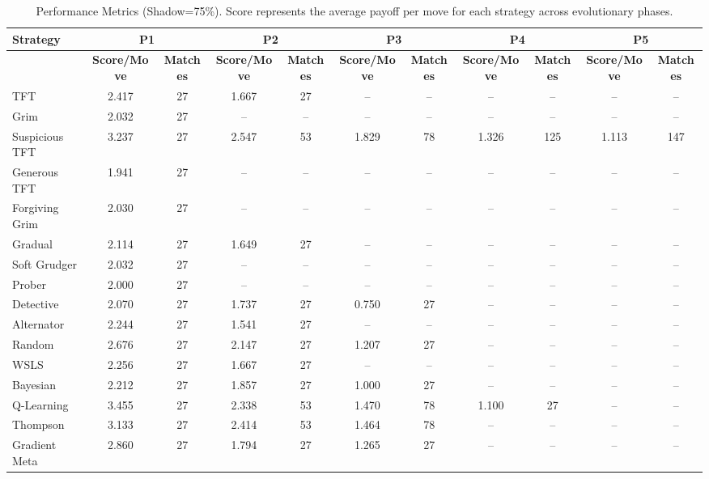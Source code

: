 \begin{table}
\centering
\scriptsize
\caption{Performance Metrics (Shadow=75\%). Score represents the average payoff per move for each strategy across evolutionary phases.}
\label{tab:experiment_20250811_131553_performance}
\begin{tabular}{|l|cc|cc|cc|cc|cc|}
\hline
\textbf{Strategy} & \multicolumn{2}{c|}{\textbf{P1}} & \multicolumn{2}{c|}{\textbf{P2}} & \multicolumn{2}{c|}{\textbf{P3}} & \multicolumn{2}{c|}{\textbf{P4}} & \multicolumn{2}{c|}{\textbf{P5}} \\
\hline
 & \textbf{Score/Move} & \textbf{Matches} & \textbf{Score/Move} & \textbf{Matches} & \textbf{Score/Move} & \textbf{Matches} & \textbf{Score/Move} & \textbf{Matches} & \textbf{Score/Move} & \textbf{Matches} \\
\hline
TFT & 2.417 & 27 & 1.667 & 27 & -- & -- & -- & -- & -- & -- \\
Grim & 2.032 & 27 & -- & -- & -- & -- & -- & -- & -- & -- \\
Suspicious TFT & 3.237 & 27 & 2.547 & 53 & 1.829 & 78 & 1.326 & 125 & 1.113 & 147 \\
Generous TFT & 1.941 & 27 & -- & -- & -- & -- & -- & -- & -- & -- \\
Forgiving Grim & 2.030 & 27 & -- & -- & -- & -- & -- & -- & -- & -- \\
Gradual & 2.114 & 27 & 1.649 & 27 & -- & -- & -- & -- & -- & -- \\
Soft Grudger & 2.032 & 27 & -- & -- & -- & -- & -- & -- & -- & -- \\
Prober & 2.000 & 27 & -- & -- & -- & -- & -- & -- & -- & -- \\
Detective & 2.070 & 27 & 1.737 & 27 & 0.750 & 27 & -- & -- & -- & -- \\
Alternator & 2.244 & 27 & 1.541 & 27 & -- & -- & -- & -- & -- & -- \\
Random & 2.676 & 27 & 2.147 & 27 & 1.207 & 27 & -- & -- & -- & -- \\
WSLS & 2.256 & 27 & 1.667 & 27 & -- & -- & -- & -- & -- & -- \\
Bayesian & 2.212 & 27 & 1.857 & 27 & 1.000 & 27 & -- & -- & -- & -- \\
Q-Learning & 3.455 & 27 & 2.338 & 53 & 1.470 & 78 & 1.100 & 27 & -- & -- \\
Thompson & 3.133 & 27 & 2.414 & 53 & 1.464 & 78 & -- & -- & -- & -- \\
Gradient Meta & 2.860 & 27 & 1.794 & 27 & 1.265 & 27 & -- & -- & -- & -- \\

\end{tabular}
\end{table}
